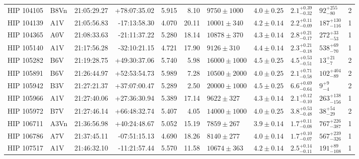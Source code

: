 \begin{landscape}
\begin{scriptsize}
\begin{longtable}{|l|lrrrrlllll|}
  HIP 104105 &     B8Vn &    21:05:29.27 &   +78:07:35.02 &   5.915 &      8.10 &   $9750 \pm 1000$ &  $4.0 \pm 0.25$ &  $2.1^{+0.39}_{-0.32}$ &     $92^{+255}_{-80}$ &       2 \\
  HIP 104139 &      A1V &    21:05:56.83 &   -17:13:58.30 &   4.070 &     20.11 &   $10001 \pm 340$ &  $4.2 \pm 0.14$ &  $2.2^{+0.11}_{-0.09}$ &   $187^{+130}_{-116}$ &       1 \\
  HIP 104365 &      A0V &    21:08:33.63 &   -21:11:37.22 &   5.280 &     18.14 &   $10878 \pm 370$ &  $4.3 \pm 0.14$ &  $2.8^{+0.21}_{-0.17}$ &     $272^{+33}_{-53}$ &       1 \\
  HIP 105140 &      A1V &    21:17:56.28 &   -32:10:21.15 &   4.721 &     17.90 &    $9126 \pm 310$ &  $4.4 \pm 0.14$ &  $2.3^{+0.21}_{-0.18}$ &     $538^{+69}_{-70}$ &       1 \\
  HIP 105282 &      B6V &    21:19:28.75 &   +49:30:37.06 &   5.740 &      5.98 &  $16000 \pm 1000$ &  $4.5 \pm 0.25$ &  $4.5^{+0.53}_{-0.51}$ &       $13^{+21}_{-7}$ &       2 \\
  HIP 105891 &      B6V &    21:26:44.97 &   +52:53:54.73 &   5.989 &      7.28 &  $10500 \pm 2000$ &  $4.0 \pm 0.25$ &  $2.1^{+0.71}_{-0.58}$ &    $102^{+404}_{-89}$ &       2 \\
  HIP 105942 &      B3V &    21:27:21.37 &   +37:07:00.47 &   5.289 &      2.50 &  $20000 \pm 1000$ &  $4.5 \pm 0.25$ &  $6.6^{+0.69}_{-0.64}$ &         $9^{+9}_{-4}$ &       2 \\
  HIP 105966 &      A1V &    21:27:40.06 &   +27:36:30.94 &   5.389 &     17.14 &    $9622 \pm 327$ &  $4.3 \pm 0.14$ &  $2.1^{+0.12}_{-0.10}$ &   $263^{+138}_{-156}$ &       1 \\
  HIP 105972 &      B7V &    21:27:46.14 &   +66:48:32.74 &   5.407 &      4.05 &  $14000 \pm 1000$ &  $4.0 \pm 0.25$ &  $3.8^{+0.53}_{-0.48}$ &      $38^{+54}_{-29}$ &       2 \\
  HIP 106711 &     A3Vn &    21:36:56.98 &   +40:24:48.67 &   5.052 &     15.19 &    $7859 \pm 267$ &  $3.9 \pm 0.14$ &  $1.7^{+0.11}_{-0.08}$ &   $767^{+226}_{-387}$ &       1 \\
  HIP 106786 &      A7V &    21:37:45.11 &   -07:51:15.13 &   4.690 &     18.26 &    $8140 \pm 277$ &  $4.0 \pm 0.14$ &  $1.7^{+0.10}_{-0.07}$ &   $567^{+239}_{-326}$ &       1 \\
  HIP 107517 &      A1V &    21:46:32.10 &   -11:21:57.44 &   5.570 &     11.58 &   $10674 \pm 363$ &  $4.2 \pm 0.14$ &  $2.5^{+0.14}_{-0.11}$ &    $191^{+89}_{-108}$ &       1 \\

\end{longtable}
\end{scriptsize}
\end{landscape}
